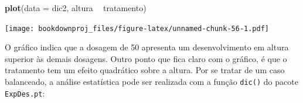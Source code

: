 \documentclass[
]{article}
\newenvironment{Shaded}{\begin{snugshade}}{\end{snugshade}}
\newcommand{\DataTypeTok}[1]{\textcolor[rgb]{0.13,0.29,0.53}{#1}}
\newcommand{\KeywordTok}[1]{\textcolor[rgb]{0.13,0.29,0.53}{\textbf{#1}}}
\newcommand{\NormalTok}[1]{#1}
\newcommand{\OperatorTok}[1]{\textcolor[rgb]{0.81,0.36,0.00}{\textbf{#1}}}
\newcommand{\OtherTok}[1]{\textcolor[rgb]{0.56,0.35,0.01}{#1}}
\newcommand{\StringTok}[1]{\textcolor[rgb]{0.31,0.60,0.02}{#1}}
\begin{document}
\begin{Shaded}
\begin{Highlighting}[]
\KeywordTok{plot}\NormalTok{(}\DataTypeTok{data =}\NormalTok{ dic2, altura }\OperatorTok{~}\StringTok{ }\NormalTok{tratamento)}
\end{Highlighting}
\end{Shaded}

\texttt{[image: bookdownproj\_files/figure-latex/unnamed-chunk-56-1.pdf]}

O gráfico indica que a dosagem de 50 apresenta um desenvolvimento em altura superior às demais dosagens. Outro ponto que fica claro com o gráfico, é que o tratamento tem um efeito quadrático sobre a altura. Por se tratar de um caso balanceado, a análise estatística pode ser realizada com a função \texttt{dic()} do pacote \texttt{ExpDes.pt}:

\begin{Shaded}
\end{Shaded}
\end{document}
